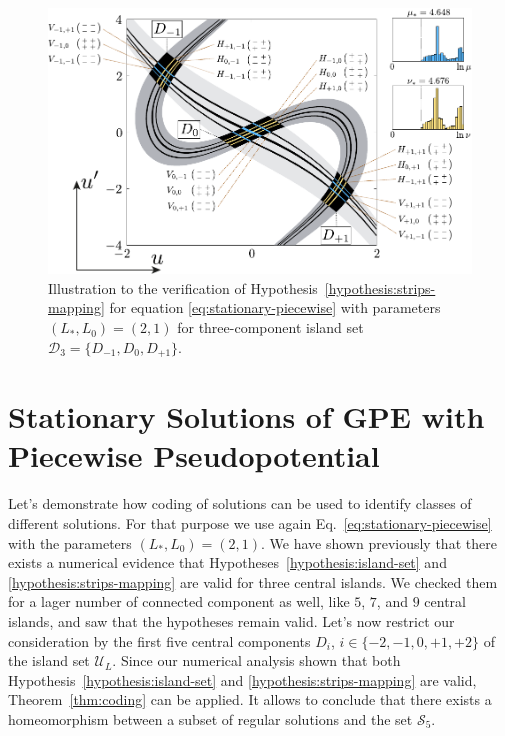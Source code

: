 \begin{figure}[h]
\centering
	\includegraphics[scale = 1]{pic/hypotheses for piecewise equation}
	\caption{
		Illustration to the verification of Hypothesis~\ref{hypothesis:strips-mapping} for equation \eqref{eq:stationary-piecewise} with parameters $(L_*, L_0) = (2, 1)$ for three-component island set $\mathcal{D}_3 = \{ D_{-1}, D_0, D_{+1} \}$.
	}
\label{fig:hypotheses-validation-piecewise}
\end{figure}

\section{Stationary Solutions of GPE with Piecewise Pseudopotential}

Let's demonstrate how coding of solutions can be used to identify classes of different solutions.
For that purpose we use again Eq.~\eqref{eq:stationary-piecewise} with the parameters $(L_*, L_0) = (2, 1)$.
We have shown previously that there exists a numerical evidence that Hypotheses~\ref{hypothesis:island-set} and \ref{hypothesis:strips-mapping} are valid for three central islands.
We checked them for a lager number of connected component as well, like $5$, $7$, and $9$ central islands, and saw that the hypotheses remain valid.
Let's now restrict our consideration by the first five central components $D_i$, $i \in \{ -2, -1, 0, +1, +2 \}$ of the island set $\mathscr{U}_L$.
Since our numerical analysis shown that both Hypothesis~\ref{hypothesis:island-set} and \ref{hypothesis:strips-mapping} are valid, Theorem~\ref{thm:coding} can be applied.
It allows to conclude that there exists a homeomorphism between a subset of regular solutions and the set $\mathcal{S}_5$.

